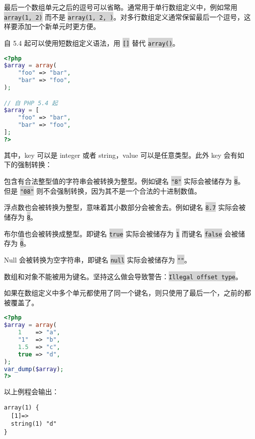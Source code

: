 最后一个数组单元之后的逗号可以省略。通常用于单行数组定义中，例如常用 \colorbox{lightgray}{\texttt{array(1, 2)}} 而不是 \colorbox{lightgray}{\texttt{array(1, 2, )}}。对多行数组定义通常保留最后一个逗号，这样要添加一个新单元时更方便。

自 5.4 起可以使用短数组定义语法，用 \colorbox{lightgray}{\texttt{[]}} 替代 \colorbox{lightgray}{\texttt{array()}}。

\begin{lstlisting}[language=PHP]
<?php
$array = array(
    "foo" => "bar",
    "bar" => "foo",
);

// 自 PHP 5.4 起
$array = [
    "foo" => "bar",
    "bar" => "foo",
];
?>
\end{lstlisting}

其中，key 可以是 integer 或者 string，value 可以是任意类型。此外 key 会有如下的强制转换：

\begin{compactitem}
\item 包含有合法整型值的字符串会被转换为整型。例如键名 \colorbox{lightgray}{\texttt{"8"}} 实际会被储存为 \colorbox{lightgray}{\texttt{8}}。但是 \colorbox{lightgray}{\texttt{"08"}} 则不会强制转换，因为其不是一个合法的十进制数值。
\item 浮点数也会被转换为整型，意味着其小数部分会被舍去。例如键名 \colorbox{lightgray}{\texttt{8.7}} 实际会被储存为 \colorbox{lightgray}{\texttt{8}}。
\item 布尔值也会被转换成整型。即键名 \colorbox{lightgray}{\texttt{true}} 实际会被储存为 \colorbox{lightgray}{\texttt{1}} 而键名 \colorbox{lightgray}{\texttt{false}} 会被储存为 \colorbox{lightgray}{\texttt{0}}。
\item Null 会被转换为空字符串，即键名 \colorbox{lightgray}{\texttt{null}} 实际会被储存为 \colorbox{lightgray}{\texttt{""}}。
\item 数组和对象不能被用为键名。坚持这么做会导致警告：\colorbox{lightgray}{\texttt{Illegal offset type}}。
\end{compactitem}

如果在数组定义中多个单元都使用了同一个键名，则只使用了最后一个，之前的都被覆盖了。

\begin{lstlisting}[language=PHP]
<?php
$array = array(
    1    => "a",
    "1"  => "b",
    1.5  => "c",
    true => "d",
);
var_dump($array);
?>
\end{lstlisting}

以上例程会输出：


\begin{verbatim}
array(1) {
  [1]=>
  string(1) "d"
}
\end{verbatim}

